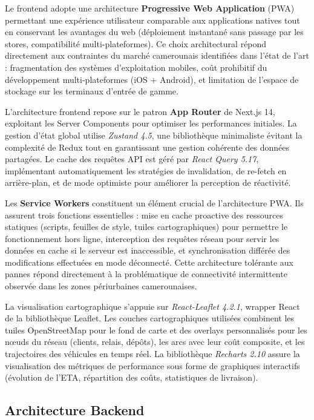 Le frontend adopte une architecture \textbf{Progressive Web Application} (PWA) permettant une expérience utilisateur comparable aux applications natives tout en conservant les avantages du web (déploiement instantané sans passage par les stores, compatibilité multi-plateformes). Ce choix architectural répond directement aux contraintes du marché camerounais identifiées dans l'état de l'art\cite{datareportal_cm} : fragmentation des systèmes d'exploitation mobiles, coût prohibitif du développement multi-plateformes (iOS + Android), et limitation de l'espace de stockage sur les terminaux d'entrée de gamme.

L'architecture frontend repose sur le patron \textbf{App Router} de Next.js 14, exploitant les Server Components pour optimiser les performances initiales. La gestion d'état global utilise \textit{Zustand 4.5}, une bibliothèque minimaliste évitant la complexité de Redux tout en garantissant une gestion cohérente des données partagées. Le cache des requêtes API est géré par \textit{React Query 5.17}, implémentant automatiquement les stratégies de invalidation, de re-fetch en arrière-plan, et de mode optimiste pour améliorer la perception de réactivité.

Les \textbf{Service Workers} constituent un élément crucial de l'architecture PWA. Ils assurent trois fonctions essentielles : mise en cache proactive des ressources statiques (scripts, feuilles de style, tuiles cartographiques) pour permettre le fonctionnement hors ligne, interception des requêtes réseau pour servir les données en cache si le serveur est inaccessible, et synchronisation différée des modifications effectuées en mode déconnecté. Cette architecture tolérante aux pannes répond directement à la problématique de connectivité intermittente observée dans les zones périurbaines camerounaises\cite{datareportal_cm}.

La visualisation cartographique s'appuie sur \textit{React-Leaflet 4.2.1}, wrapper React de la bibliothèque Leaflet. Les couches cartographiques utilisées combinent les tuiles OpenStreetMap pour le fond de carte et des overlays personnalisés pour les nœuds du réseau (clients, relais, dépôts), les arcs avec leur coût composite, et les trajectoires des véhicules en temps réel. La bibliothèque \textit{Recharts 2.10} assure la visualisation des métriques de performance sous forme de graphiques interactifs (évolution de l'ETA, répartition des coûts, statistiques de livraison).

\subsection{Architecture Backend}

